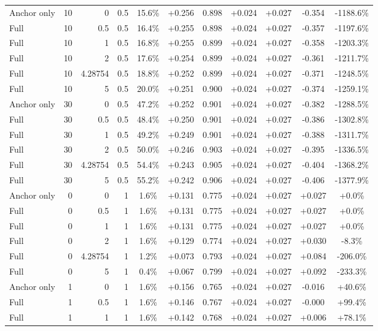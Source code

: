 \begin{table}[htbp]
\begin{tabular}{lrrrccccccc}
Anchor only & 10 & 0 & 0.5 & 15.6\% & +0.256 & 0.898 & +0.024 & +0.027 & -0.354 & -1188.6\% \\
Full & 10 & 0.5 & 0.5 & 16.4\% & +0.255 & 0.898 & +0.024 & +0.027 & -0.357 & -1197.6\% \\
Full & 10 & 1 & 0.5 & 16.8\% & +0.255 & 0.899 & +0.024 & +0.027 & -0.358 & -1203.3\% \\
Full & 10 & 2 & 0.5 & 17.6\% & +0.254 & 0.899 & +0.024 & +0.027 & -0.361 & -1211.7\% \\
Full & 10 & 4.28754 & 0.5 & 18.8\% & +0.252 & 0.899 & +0.024 & +0.027 & -0.371 & -1248.5\% \\
Full & 10 & 5 & 0.5 & 20.0\% & +0.251 & 0.900 & +0.024 & +0.027 & -0.374 & -1259.1\% \\
Anchor only & 30 & 0 & 0.5 & 47.2\% & +0.252 & 0.901 & +0.024 & +0.027 & -0.382 & -1288.5\% \\
Full & 30 & 0.5 & 0.5 & 48.4\% & +0.250 & 0.901 & +0.024 & +0.027 & -0.386 & -1302.8\% \\
Full & 30 & 1 & 0.5 & 49.2\% & +0.249 & 0.901 & +0.024 & +0.027 & -0.388 & -1311.7\% \\
Full & 30 & 2 & 0.5 & 50.0\% & +0.246 & 0.903 & +0.024 & +0.027 & -0.395 & -1336.5\% \\
Full & 30 & 4.28754 & 0.5 & 54.4\% & +0.243 & 0.905 & +0.024 & +0.027 & -0.404 & -1368.2\% \\
Full & 30 & 5 & 0.5 & 55.2\% & +0.242 & 0.906 & +0.024 & +0.027 & -0.406 & -1377.9\% \\
Anchor only & 0 & 0 & 1 & 1.6\% & +0.131 & 0.775 & +0.024 & +0.027 & +0.027 & +0.0\% \\
Full & 0 & 0.5 & 1 & 1.6\% & +0.131 & 0.775 & +0.024 & +0.027 & +0.027 & +0.0\% \\
Full & 0 & 1 & 1 & 1.6\% & +0.131 & 0.775 & +0.024 & +0.027 & +0.027 & +0.0\% \\
Full & 0 & 2 & 1 & 1.6\% & +0.129 & 0.774 & +0.024 & +0.027 & +0.030 & -8.3\% \\
Full & 0 & 4.28754 & 1 & 1.2\% & +0.073 & 0.793 & +0.024 & +0.027 & +0.084 & -206.0\% \\
Full & 0 & 5 & 1 & 0.4\% & +0.067 & 0.799 & +0.024 & +0.027 & +0.092 & -233.3\% \\
Anchor only & 1 & 0 & 1 & 1.6\% & +0.156 & 0.765 & +0.024 & +0.027 & -0.016 & +40.6\% \\
Full & 1 & 0.5 & 1 & 1.6\% & +0.146 & 0.767 & +0.024 & +0.027 & -0.000 & +99.4\% \\
Full & 1 & 1 & 1 & 1.6\% & +0.142 & 0.768 & +0.024 & +0.027 & +0.006 & +78.1\% \\

\end{tabular}
\end{table}
